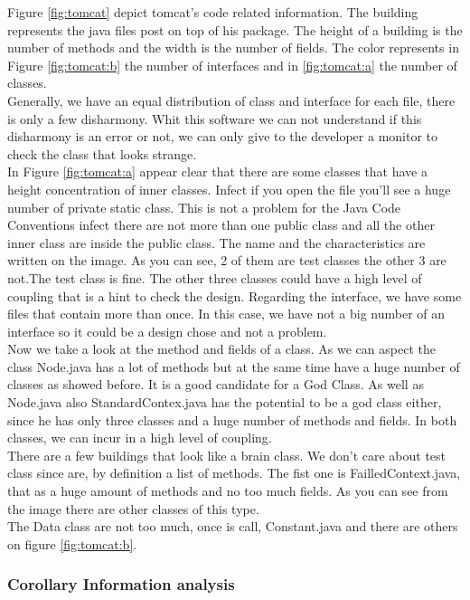 \documentclass[]{usiinfbachelorproject}
\begin{document}
Figure \ref{fig:tomcat} depict tomcat's code related information. The building represents the java files post on top of his package. The height of a building is the number of methods and the width is the number of fields. The color represents in Figure \ref{fig:tomcat:b} the number of interfaces and in \ref{fig:tomcat:a} the number of classes.\\
Generally, we have an equal distribution of class and interface for each file, there is only a few disharmony. Whit this software we can not understand if this disharmony is an error or not, we can only give to the developer a monitor to check the class that looks strange.\\
In Figure \ref{fig:tomcat:a} appear clear that there are some classes that have a height concentration of inner classes. Infect if you open the file you'll see a huge number of private static class. This is not a problem for the Java Code Conventions \cite{oracle} infect there are not more than one public class and all the other inner class are inside the public class. The name and the characteristics are written on the image. As you can see, 2 of them are test classes the other 3 are not.The test class is fine. The other three classes could have a high level of coupling that is a hint to check the design. Regarding the interface, we have some files that contain more than once. In this case, we have not a big number of an interface so it could be a design chose and not a problem.\\
Now we take a look at the method and fields of a class. As we can aspect the class Node.java has a lot of methods  but at the same time have a huge number of classes as  showed before. It is a good candidate for a God Class. As well as Node.java also StandardContex.java has the potential to be a god class either, since he has only three classes and a huge number of methods and fields. In both classes, we can incur in a high level of coupling.\\
There are a few buildings that look like a brain class. We don't care about test class since are, by definition a list of methods. The fist one is FailledContext.java, that as a huge amount of methods and no too much fields. As you can see from the image there are other classes of this type.\\
The Data class are not too much, once is call, Constant.java and there are others on figure \ref{fig:tomcat:b}.



\subsubsection{Corollary Information analysis}
\end{document}
